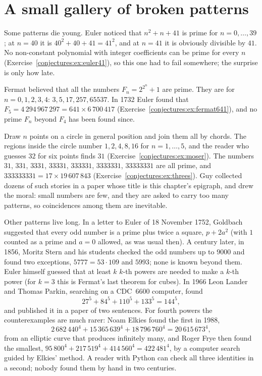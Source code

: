 \section{A small gallery of broken patterns}

Some patterns die young. Euler noticed that $n^2+n+41$ is prime for $n=0,\dots,39$; at $n=40$ it is $40^2+40+41=41^2$, and at $n=41$ it is obviously divisible
by $41$. No non-constant polynomial with integer coefficients can be prime for every $n$ (Exercise~\ref{conjectures:ex:euler41}), so this one had to fail somewhere; the
surprise is only how late.

Fermat believed that all the numbers $F_n=2^{2^n}+1$ are prime. They are for $n=0,1,2,3,4$: $3,5,17,257,65537$. In 1732 Euler found that
$F_5=4\,294\,967\,297=641\times6\,700\,417$ (Exercise~\ref{conjectures:ex:fermat641}), and no prime $F_n$ beyond $F_4$ has been found since.

Draw $n$ points on a circle in general position and join them all by chords. The regions inside the circle number $1,2,4,8,16$ for $n=1,\dots,5$, and the reader
who guesses $32$ for six points finds $31$ (Exercise~\ref{conjectures:ex:moser}). The numbers $31$, $331$, $3331$, $33331$, $333331$, $3333331$, $33333331$ are all prime, and
$333333331=17\times19\,607\,843$ (Exercise~\ref{conjectures:ex:threes}). Guy collected dozens of such stories in a paper whose title is this chapter's epigraph, and drew the
moral: small numbers are few, and they are asked to carry too many patterns, so coincidences among them are inevitable.

Other patterns live long. In a letter to Euler of 18 November 1752, Goldbach suggested that every odd number is a prime plus twice a square, $p+2a^2$ (with $1$
counted as a prime and $a=0$ allowed, as was usual then). A century later, in 1856, Moritz Stern and his students checked the odd numbers up to $9000$ and
found two exceptions, $5777=53\cdot109$ and $5993$; none is known beyond them. Euler himself guessed that at least $k$ $k$-th powers are needed to make a
$k$-th power (for $k=3$ this is Fermat's last theorem for cubes). In 1966 Leon Lander and Thomas Parkin, searching on a CDC~6600 computer, found
\[
27^5+84^5+110^5+133^5=144^5,
\]
and published it in a paper of two sentences. For fourth powers the counterexamples are much rarer: Noam Elkies found the first in 1988,
\[
2\,682\,440^4+15\,365\,639^4+18\,796\,760^4=20\,615\,673^4,
\]
from an elliptic curve that produces infinitely many, and Roger Frye then found the smallest, $95\,800^4+217\,519^4+414\,560^4=422\,481^4$, by a computer search
guided by Elkies' method. A reader with Python can check all three identities in a second; nobody found them by hand in two centuries.

